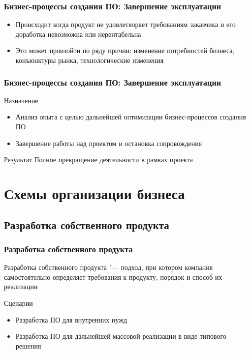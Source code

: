\documentclass{../industrial-development}
\begin{document}
\begin{frame} \frametitle{Бизнес-процессы создания ПО: Завершение эксплуатации}
	\begin{itemize}
		\item Происходит когда продукт не удовлетворяет требованиям заказчика и его доработка невозможна или нерентабельна
		\item Это может произойти по ряду причин: изменение потребностей бизнеса, конъюнктуры рынка, технологические изменения
	\end{itemize}
\end{frame}


\begin{frame} \frametitle{Бизнес-процессы создания ПО: Завершение эксплуатации}
	\begin{block}{Назначение}
		\begin{itemize}
			\item Анализ опыта с целью дальнейшей оптимизации бизнес-процессов создания ПО
			\item Завершение работы над проектом и остановка сопровождения
		\end{itemize}
	\end{block}
	\begin{block}{Результат}
		Полное прекращение деятельности в рамках проекта
	\end{block}
\end{frame}


\section{Схемы организации бизнеса}

\subsection{Разработка собственного продукта}


\begin{frame} \frametitle{Разработка собственного продукта}
	\begin{block}{}
		\alert{Разработка собственного продукта} "--- подход, при котором компания самостоятельно определяет требования к продукту, порядок и способ их реализации
	\end{block}
	\begin{block}{Сценарии}
		\begin{itemize}
			\item Разработка ПО для внутренних нужд
			\item Разработка ПО для дальнейшей массовой реализации в виде типового решения
		\end{itemize}
	\end{block}
\end{frame}
\end{document}
